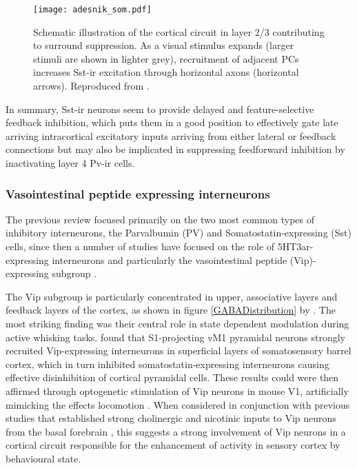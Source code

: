 \begin{figure}
	\centering
        \texttt{[image: adesnik\_som.pdf]}
	\caption{Schematic illustration of the cortical circuit in
          layer 2/3 contributing to surround suppression. As a visual
          stimulus expands (larger stimuli are shown in lighter grey),
          recruitment of adjacent PCs increases Sst-ir excitation
          through horizontal axons (horizontal arrows). Reproduced
          from \cite{Adesnik2012}.}
	\label{som}
\end{figure}

In summary, Sst-ir neurons seem to provide delayed and
feature-selective feedback inhibition, which puts them in a good
position to effectively gate late arriving intracortical excitatory
inputs arriving from either lateral or feedback connections but may
also be implicated in suppressing feedforward inhibition by
inactivating layer 4 Pv-ir cells.

\subsubsection{Vasointestinal peptide expressing interneurons}

The previous review focused primarily on the two most common types of
inhibitory interneurons, the Parvalbumin (PV) and
Somatostatin-expressing (Sst) cells, since then a number of studies
have focused on the role of 5HT3ar-expressing interneurons and
particularly the vasointestinal peptide (Vip)-expressing subgroup
\citep{Fu2014, Higley2014, Kepecs2014, Lee2013}.

The Vip subgroup is particularly concentrated in upper, associative
layers and feedback layers of the cortex, as shown in figure
\ref{GABADistribution} by \cite{Rudy2011}. The most striking finding
was their central role in state dependent modulation during active
whisking tasks. \cite{Lee2013} found that S1-projecting vM1 pyramidal
neurons strongly recruited Vip-expressing interneurons in superficial
layers of somatosensory barrel cortex, which in turn inhibited
somatostatin-expressing interneurons causing effective disinhibition
of cortical pyramidal cells. These results could were then affirmed
through optogenetic stimulation of Vip neurons in mouse V1,
artificially mimicking the effects locomotion \citep{Fu2014}. When
considered in conjunction with previous studies that established
strong cholinergic and nicotinic inputs to Vip neurons from the basal
forebrain \citep{Wickersham2009}, this suggests a strong involvement
of Vip neurons in a cortical circuit responsible for the enhancement
of activity in sensory cortex by behavioural state.

